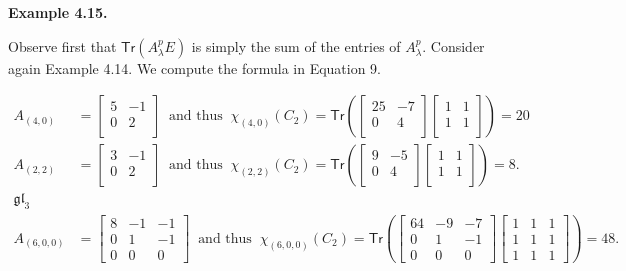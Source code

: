 \documentclass[10pt,a4paper]{article}
\begin{document}
\par\medskip\noindent\textbf{Example 4.15.}\par



Observe first that $\mathsf{Tr}(A_{\lambda}^{p}E)$ is simply the sum of the entries of $A_{\lambda}^{p}$.
Consider again Example 4.14. We compute the formula in Equation 9.



\[\begin{aligned}
\displaystyle A_{(4,0)} & \displaystyle=\left[\begin{smallmatrix}5&-1\\ 0&2\\ \end{smallmatrix}\right]\ \text{ and thus }\ \chi_{(4,0)}(C_{2})=\mathsf{Tr}\left(\left[\begin{smallmatrix}25&-7\\ 0&4\\ \end{smallmatrix}\right]\left[\begin{smallmatrix}1&1\\ 1&1\\ \end{smallmatrix}\right]\right)=20 \\
\displaystyle A_{(2,2)} & \displaystyle=\left[\begin{smallmatrix}3&-1\\ 0&2\\ \end{smallmatrix}\right]\ \text{ and thus }\ \chi_{(2,2)}(C_{2})=\mathsf{Tr}\left(\left[\begin{smallmatrix}9&-5\\ 0&4\\ \end{smallmatrix}\right]\left[\begin{smallmatrix}1&1\\ 1&1\\ \end{smallmatrix}\right]\right)=8. \\
\mathfrak{gl}_{3} \\
\displaystyle A_{(6,0,0)} & \displaystyle=\left[\begin{smallmatrix}8&-1&-1\\ 0&1&-1\\ 0&0&0\end{smallmatrix}\right]\ \text{ and thus }\ \chi_{(6,0,0)}(C_{2})=\mathsf{Tr}\left(\left[\begin{smallmatrix}64&-9&-7\\ 0&1&-1\\ 0&0&0\end{smallmatrix}\right]\left[\begin{smallmatrix}1&1&1\\ 1&1&1\\ 1&1&1\end{smallmatrix}\right]\right)=48.\ 
\end{aligned}\]
\end{document}
